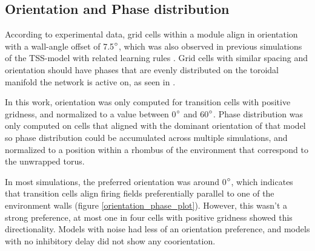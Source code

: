 \documentclass{article}
\begin{document}
    \subsection{Orientation and Phase distribution} \label{OrientationPhaseResults}

    According to experimental data, grid cells within a module align in orientation with a wall-angle offset of 7.5\(\degree\), which was also observed in previous simulations of the TSS-model with related learning rules \parencite{Stensola2015, Waniek2017}. Grid cells with similar spacing and orientation should have phases that are evenly distributed on the toroidal manifold the network is active on, as seen in \cite{Gardner2022}. 
    
    In this work, orientation was only computed for transition cells with positive gridness, and normalized to a value between 0\(\degree\) and 60\(\degree\). Phase distribution was only computed on cells that aligned with the dominant orientation of that model so phase distribution could be accumulated across multiple simulations, and normalized to a position within a rhombus of the environment that correspond to the unwrapped torus.

    In most simulations, the preferred orientation was around 0\(\degree\), which indicates that transition cells align firing fields preferentially parallel to one of the environment walls (figure \ref{orientation_phase_plot}). However, this wasn't a strong preference, at most one in four cells with positive gridness showed this directionality. Models with noise had less of an orientation preference, and models with no inhibitory delay did not show any coorientation. 
    
\end{document}
